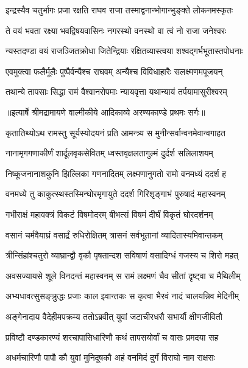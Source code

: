 \twolineshloka
{इन्द्रस्यैव चतुर्भागः प्रजा रक्षति राघव}
{राजा तस्माद्वनान्भोगान्भुङ्क्ते लोकनमस्कृतः} %

\twolineshloka
{ते वयं भवता रक्ष्या भवद्विषयवासिनः}
{नगरस्थो वनस्थो वा त्वं नो राजा जनेश्वरः} %

\twolineshloka
{न्यस्तदण्डा वयं राजञ्जितक्रोधा जितेन्द्रियाः}
{रक्षितव्यास्त्वया शश्वद्गर्भभूतास्तपोधनाः} %

\twolineshloka
{एवमुक्त्वा फलैर्मूलैः पुष्पैर्वन्यैश्च राघवम्}
{अन्यैश्च विविधाहारैः सलक्ष्मणमपूजयन्} %

\twolineshloka
{तथान्ये तापसाः सिद्धा रामं वैश्वानरोपमाः}
{न्यायवृत्ता यथान्यायं तर्पयामासुरीश्वरम्} %


{॥इत्यार्षे श्रीमद्रामायणे वाल्मीकीये आदिकाव्ये अरण्यकाण्डे प्रथमः सर्गः॥}


\twolineshloka
{कृतातिथ्योऽथ रामस्तु सूर्यस्योदयनं प्रति}
{आमन्त्र्य स मुनीन्सर्वान्वनमेवान्वगाहत} %

\twolineshloka
{नानामृगगणाकीर्णं शार्दूलवृकसेवितम्}
{ध्वस्तवृक्षलतागुल्मं दुर्दर्श सलिलाशयम्} %

\twolineshloka
{निष्कूजनानाशकुनि झिल्लिका गणनादितम्}
{लक्ष्मणानुगतो रामो वनमध्यं ददर्श ह} %

\twolineshloka
{वनमध्ये तु काकुत्स्थस्तस्मिन्घोरमृगायुते}
{ददर्श गिरिशृङ्गाभं पुरुषादं महास्वनम्} %

\twolineshloka
{गभीराक्षं महावक्त्रं विकटं विषमोदरम्}
{बीभत्सं विषमं दीर्घं विकृतं घोरदर्शनम्} %

\twolineshloka
{वसानं चर्मवैयाघ्रं वसार्द्रं रुधिरोक्षितम्}
{त्रासनं सर्वभूतानां व्यादितास्यमिवान्तकम्} %

\twolineshloka
{त्रीन्सिंहांश्चतुरो व्याघ्रान्द्वौ वृकौ पृषतान्दश}
{सविषाणं वसादिग्धं गजस्य च शिरो महत्} %

\twolineshloka
{अवसज्यायसे शूले विनदन्तं महास्वनम्}
{स रामं लक्ष्मणं चैव सीतां दृष्ट्वा च मैथिलीम्} %

\twolineshloka
{अभ्यधावत्सुसङ्क्रुद्धः प्रजाः काल इवान्तकः}
{स कृत्वा भैरवं नादं चालयन्निव मेदिनीम्} %

\twolineshloka
{अङ्गेनादाय वैदेहीमपक्रम्य ततोऽब्रवीत्}
{युवां जटाचीरधरौ सभार्यौ क्षीणजीवितौ} %

\twolineshloka
{प्रविष्टौ दण्डकारण्यं शरचापासिधारिणौ}
{कथं तापसयोर्वां च वासः प्रमदया सह} %

\twolineshloka
{अधर्मचारिणौ पापौ कौ युवां मुनिदूषकौ}
{अहं वनमिदं दुर्गं विराघो नाम राक्षसः} %

